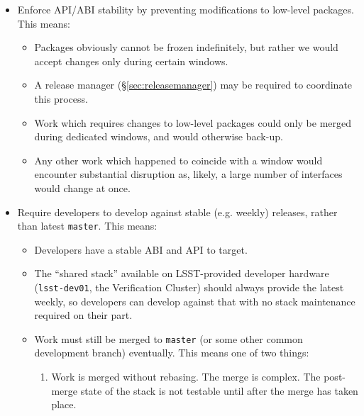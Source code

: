 \documentclass[letterpaper]{scrartcl}
\begin{document}
\begin{itemize}

  \item{Enforce API/ABI stability by preventing modifications to low-level
  packages. This means:

    \begin{itemize}

      \item{Packages obviously cannot be frozen indefinitely, but rather we
      would accept changes only during certain windows.}

      \item{A release manager (\S\ref{sec:releasemanager}) may be required
      to coordinate this process.}

      \item{Work which requires changes to low-level packages could only be
      merged during dedicated windows, and would otherwise back-up.}

      \item{Any other work which happened to coincide with a window would
      encounter substantial disruption as, likely, a large number of
      interfaces would change at once.}

    \end{itemize}

  }

  \item{Require developers to develop against stable (e.g. weekly) releases,
  rather than latest \texttt{master}. This means:

    \begin{itemize}

      \item{Developers have a stable ABI and API to target.}

      \item{The ``shared stack'' available on LSST-provided developer hardware
      (\texttt{lsst-dev01}, the Verification Cluster) should always provide
      the latest weekly, so developers can develop against that with no stack
      maintenance required on their part.}

      \item{Work must still be merged to \texttt{master} (or some other
      common development branch) eventually. This means one of two things:

        \begin{enumerate}

          \item{Work is merged without rebasing. The merge is complex. The
          post-merge state of the stack is not testable until after the merge
          has taken place.}


\end{enumerate}}
\end{itemize}}
\end{itemize}
\end{document}
